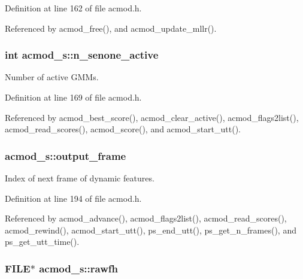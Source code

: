Definition at line 162 of file acmod.\-h.



Referenced by acmod\-\_\-free(), and acmod\-\_\-update\-\_\-mllr().

\subsubsection[{n\-\_\-senone\-\_\-active}]{\setlength{\rightskip}{0pt plus 5cm}int acmod\-\_\-s\-::n\-\_\-senone\-\_\-active}\label{structacmod__s_a5081a507e3ca6de6c5695217245dc9f9}


Number of active G\-M\-Ms. 



Definition at line 169 of file acmod.\-h.



Referenced by acmod\-\_\-best\-\_\-score(), acmod\-\_\-clear\-\_\-active(), acmod\-\_\-flags2list(), acmod\-\_\-read\-\_\-scores(), acmod\-\_\-score(), and acmod\-\_\-start\-\_\-utt().

\subsubsection[{output\-\_\-frame}]{ acmod\-\_\-s\-::output\-\_\-frame}\label{structacmod__s_aec694af0767ac5e8f1022b6252111885}


Index of next frame of dynamic features. 



Definition at line 194 of file acmod.\-h.



Referenced by acmod\-\_\-advance(), acmod\-\_\-flags2list(), acmod\-\_\-read\-\_\-scores(), acmod\-\_\-rewind(), acmod\-\_\-start\-\_\-utt(), ps\-\_\-end\-\_\-utt(), ps\-\_\-get\-\_\-n\-\_\-frames(), and ps\-\_\-get\-\_\-utt\-\_\-time().

\subsubsection[{rawfh}]{\setlength{\rightskip}{0pt plus 5cm}F\-I\-L\-E$\ast$ acmod\-\_\-s\-::rawfh}\label{structacmod__s_aeac89442a04744ca607c4c66dab053e8}


